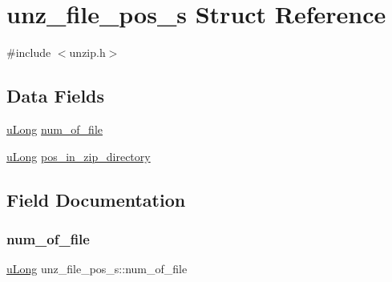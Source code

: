 \hypertarget{structunz__file__pos__s}{}\section{unz\+\_\+file\+\_\+pos\+\_\+s Struct Reference}
\label{structunz__file__pos__s}


{\ttfamily \#include $<$unzip.\+h$>$}

\subsection*{Data Fields}
\begin{DoxyCompactItemize}
\item 
\hyperlink{ioapi_8h_a50e9e9d5c30e481de822ad68fe537986}{u\+Long} \hyperlink{structunz__file__pos__s_a771dc0b7dba811b6174382f87f6800fc}{num\+\_\+of\+\_\+file}
\item 
\hyperlink{ioapi_8h_a50e9e9d5c30e481de822ad68fe537986}{u\+Long} \hyperlink{structunz__file__pos__s_a87d193346d3825363f899f574a2f3cb2}{pos\+\_\+in\+\_\+zip\+\_\+directory}
\end{DoxyCompactItemize}


\subsection{Field Documentation}
\mbox{\label{structunz__file__pos__s_a771dc0b7dba811b6174382f87f6800fc}} 
\subsubsection{\texorpdfstring{num\+\_\+of\+\_\+file}{num\_of\_file}}
{\footnotesize\ttfamily \hyperlink{ioapi_8h_a50e9e9d5c30e481de822ad68fe537986}{u\+Long} unz\+\_\+file\+\_\+pos\+\_\+s\+::num\+\_\+of\+\_\+file}

\mbox{\label{structunz__file__pos__s_a87d193346d3825363f899f574a2f3cb2}} 
